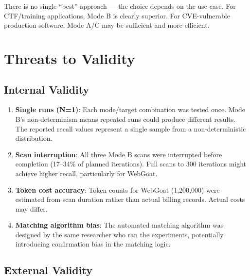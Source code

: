 \documentclass[12pt,a4paper,oneside]{book}
\begin{document}
There is no single ``best'' approach — the choice depends on the use case. For CTF/training applications, Mode B is clearly superior. For CVE-vulnerable production software, Mode A/C may be sufficient and more efficient.

\chapter{Threats to Validity}

\section{Internal Validity}

\begin{enumerate}
    \item \textbf{Single runs (N=1)}: Each mode/target combination was tested once. Mode B's non-determinism means repeated runs could produce different results. The reported recall values represent a single sample from a non-deterministic distribution.
    
    \item \textbf{Scan interruption}: All three Mode B scans were interrupted before completion (17–34\% of planned iterations). Full scans to 300 iterations might achieve higher recall, particularly for WebGoat.
    
    \item \textbf{Token cost accuracy}: Token counts for WebGoat (1,200,000) were estimated from scan duration rather than actual billing records. Actual costs may differ.
    
    \item \textbf{Matching algorithm bias}: The automated matching algorithm was designed by the same researcher who ran the experiments, potentially introducing confirmation bias in the matching logic.
\end{enumerate}

\section{External Validity}
\end{document}
